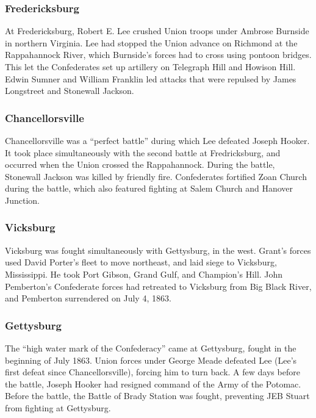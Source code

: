 \subsubsection*{Fredericksburg}

At Fredericksburg, Robert E. Lee crushed Union troops under Ambrose Burnside in northern Virginia.
Lee had stopped the Union advance on Richmond at the Rappahannock River,
which Burnside's forces had to cross using pontoon bridges.
This let the Confederates set up artillery on Telegraph Hill and Howison Hill.
Edwin Sumner and William Franklin led attacks that were repulsed by James Longstreet and Stonewall Jackson.

\subsubsection*{Chancellorsville}

Chancellorsville was a ``perfect battle'' during which Lee defeated Joseph Hooker.
It took place simultaneously with the second battle at Fredricksburg,
and occurred when the Union crossed the Rappahannock.
During the battle, Stonewall Jackson was killed by friendly fire.
Confederates fortified Zoan Church during the battle,
which also featured fighting at Salem Church and Hanover Junction.

\subsubsection*{Vicksburg}

Vicksburg was fought simultaneously with Gettysburg, in the west.
Grant's forces used David Porter's fleet to move northeast, and laid siege to Vicksburg, Mississippi.
He took Port Gibson, Grand Gulf, and Champion's Hill.
John Pemberton's Confederate forces had retreated to Vicksburg from Big Black River,
and Pemberton surrendered on July 4, 1863.

\subsubsection*{Gettysburg}

The ``high water mark of the Confederacy'' came at Gettysburg, fought in the beginning of July 1863.
Union forces under George Meade defeated Lee (Lee's first defeat since Chancellorsville), forcing him to turn back.
A few days before the battle, Joseph Hooker had resigned command of the Army of the Potomac.
Before the battle, the Battle of Brady Station was fought, preventing JEB Stuart from fighting at Gettysburg.

